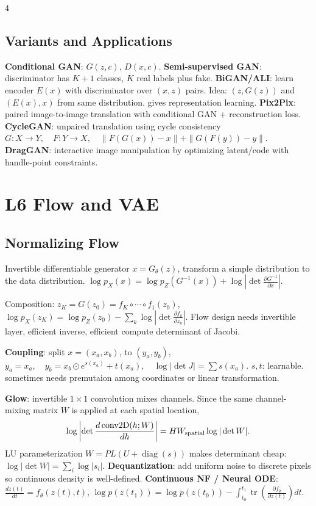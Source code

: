 \documentclass{article}
\newcommand{\key}[1]{\textbf{#1}}
\newcommand{\1}{\mathbf 1}
\DeclareMathOperator{\tr}{tr}
\begin{document}
\begin{multicols*}{4}
\subsection{Variants and Applications}
\key{Conditional GAN}: $G(z,c)$, $D(x,c)$. \key{Semi-supervised GAN}: discriminator has $K+1$ classes, $K$ real labels plus fake. \key{BiGAN/ALI}: learn encoder $E(x)$ with discriminator over $(x,z)$ pairs. Idea: $(z,G(z))$ and $(E(x),x)$ from same distribution. gives representation learning. \key{Pix2Pix}: paired image-to-image translation with conditional GAN + reconstruction loss. \key{CycleGAN}: unpaired translation using cycle consistency
\(
G:X\to Y,\quad F:Y\to X,\quad \|F(G(x))-x\|+\|G(F(y))-y\|.
\)
\key{DragGAN}: interactive image manipulation by optimizing latent/code with handle-point constraints.

\section{L6 Flow and VAE}
\subsection{Normalizing Flow}
Invertible differentiable generator $x=G_\theta(z)$,  transform a simple distribution to the data distribution. 
\(
\log p_X(x)=\log p_Z(G^{-1}(x))+\log\left|\det\frac{\partial G^{-1}}{\partial x}\right|.
\)

Composition: $z_K=G(z_0)=f_K\circ\cdots\circ f_1(z_0)$, 
$\log p_X(z_K)=\log p_Z(z_0)-\sum_k \log |\det \frac{\partial f_k}{\partial z_k}|$. 
Flow design needs invertible layer, efficient inverse, efficient compute determinant of Jacobi. 

\key{Coupling}: split $x=(x_a,x_b)$, to $(y_a,y_b)$, 
\(
y_a=x_a,\quad y_b=x_b\odot e^{s(x_a)}+t(x_a),\quad
\log|\det J|=\sum s(x_a). 
\)
$s,t$: learnable. sometimes needs premutaion among coordinates or linear transformation.  

\key{Glow}: invertible $1\times1$ convolution mixes channels. Since the same channel-mixing matrix $W$ is applied at each spatial location,
\[
\log\left|\det\frac{d\,{\rm conv2D}(h;W)}{dh}\right|=H W_{\rm spatial}\log|\det W|.
\]
LU parameterization $W=PL(U+\operatorname{diag}(s))$ makes determinant cheap: $\log|\det W|=\sum_i\log|s_i|$. \key{Dequantization}: add uniform noise to discrete pixels so continuous density is well-defined.
\key{Continuous NF / Neural ODE}: $\frac{dz(t)}{dt}=f_\theta(z(t),t)$,
\(
\log p(z(t_1))=\log p(z(t_0))-\int_{t_0}^{t_1}\tr\left(\frac{\partial f_\theta}{\partial z(t)}\right)dt.
\)


\end{multicols*}
\end{document}
